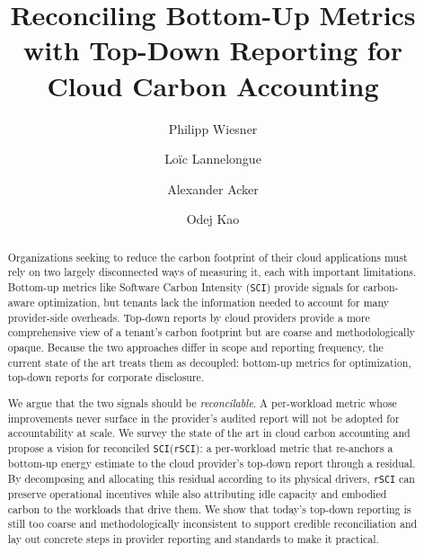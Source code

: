 \documentclass[sigconf]{acmart}
\newcommand{\SCI}{\texttt{SCI}\xspace}
\newcommand{\RSCI}{\texttt{rSCI}\xspace}
\begin{document}
\title{Reconciling Bottom-Up Metrics with Top-Down Reporting for Cloud Carbon Accounting}

\author{Philipp Wiesner}

\author{Loïc Lannelongue}

\author{Alexander Acker}

\author{Odej Kao}

\begin{abstract}
Organizations seeking to reduce the carbon footprint of their cloud applications must rely on two largely disconnected ways of measuring it, each with important limitations.
Bottom-up metrics like Software Carbon Intensity (\SCI) provide signals for carbon-aware optimization, but tenants lack the information needed to account for many provider-side overheads.
Top-down reports by cloud providers provide a more comprehensive view of a tenant's carbon footprint but are coarse and methodologically opaque.
Because the two approaches differ in scope and reporting frequency, the current state of the art treats them as decoupled: bottom-up metrics for optimization, top-down reports for corporate disclosure.

We argue that the two signals should be \emph{reconcilable}.
A per-work\-load metric whose improvements never surface in the provider's audited report will not be adopted for accountability at scale.
We survey the state of the art in cloud carbon accounting and propose a vision for reconciled \SCI (\RSCI): a per-workload metric that re-anchors a bottom-up energy estimate to the cloud provider's top-down report through a residual.
By decomposing and allocating this residual according to its physical drivers, \RSCI can preserve operational incentives while also attributing idle capacity and embodied carbon to the workloads that drive them.
We show that today's top-down reporting is still too coarse and methodologically inconsistent to support credible reconciliation and lay out concrete steps in provider reporting and standards to make it practical.
\end{abstract}
\end{document}
